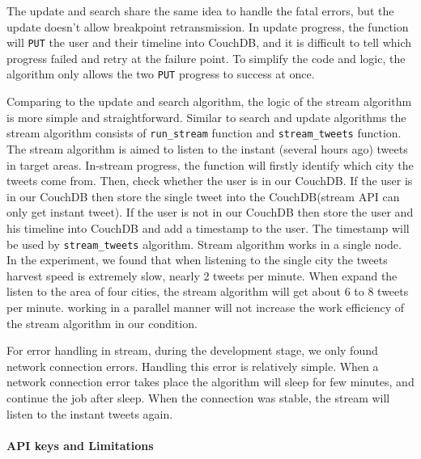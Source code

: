 The update and search share the same idea to handle the fatal errors, but the update doesn't allow breakpoint retransmission. In update progress, the function will \texttt{PUT} the user and their timeline into CouchDB, and it is difficult to tell which progress failed and retry at the failure point. To simplify the code and logic, the algorithm only allows the two \texttt{PUT} progress to success at once.

Comparing to the update and search algorithm, the logic of the stream algorithm is more simple and straightforward. Similar to search and update algorithms the stream algorithm consists of \texttt{run_stream} function and \texttt{stream_tweets} function. The stream algorithm is aimed to listen to the instant (several hours ago) tweets in target areas. In-stream progress, the function will firstly identify which city the tweets come from. Then, check whether the user is in our CouchDB. If the user is in our CouchDB then store the single tweet into the CouchDB(stream API can only get instant tweet). If the user is not in our CouchDB then store the user and his timeline into CouchDB and add a timestamp to the user. The timestamp will be used by \texttt{stream_tweets} algorithm. Stream algorithm works in a single node. In the experiment, we found that when listening to the single city the tweets harvest speed is extremely slow, nearly 2 tweets per minute. When expand the listen to the area of four cities, the stream algorithm will get about 6 to 8 tweets per minute. working in a parallel manner will not increase the work efficiency of the stream algorithm in our condition.

For error handling in stream, during the development stage, we only found network connection errors. Handling this error is relatively simple. When a network connection error takes place the algorithm will sleep for few minutes, and continue the job after sleep. When the connection was stable, the stream will listen to the instant tweets again. 

\paragraph{API keys and Limitations}

